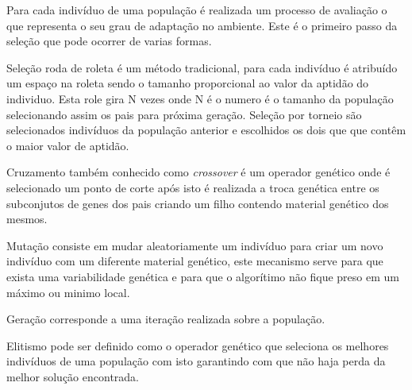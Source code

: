 \documentclass{abntpuc}
\begin{document}
Para cada indivíduo de uma população é realizada um processo de avaliação o que representa o seu grau de adaptação no ambiente. Este é o primeiro passo da seleção que pode ocorrer de varias formas.\par

Seleção roda de roleta é um método tradicional, para cada indivíduo é atribuído um espaço na roleta sendo o tamanho proporcional ao valor da aptidão do individuo. Esta role gira N vezes onde N é o numero é o tamanho da população selecionando assim os pais para próxima geração. Seleção por torneio são selecionados indivíduos da população anterior e escolhidos os dois que que contêm o maior valor de aptidão.\par

Cruzamento também conhecido como \textit{crossover} é um operador genético onde é selecionado um ponto de corte após isto é realizada a troca genética entre os subconjutos de genes dos pais criando um filho contendo material genético dos mesmos.

Mutação consiste em mudar aleatoriamente um indivíduo para criar um novo indivíduo com um diferente material genético, este mecanismo serve para que exista uma variabilidade genética e para que o algorítimo não fique preso em um máximo ou minimo local.

Geração corresponde a uma iteração realizada sobre a população.

Elitismo pode ser definido como o operador genético que seleciona os melhores indivíduos de uma população com isto garantindo com que não haja perda da melhor solução encontrada.
\end{document}
